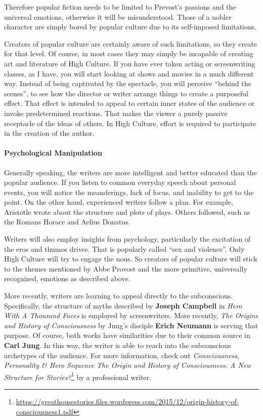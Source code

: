 Therefore popular fiction needs to be limited to Prevost's passions and the universal emotions, otherwise it will be misunderstood. Those of a nobler character are simply bored by popular culture due to its self-imposed limitations.

Creators of popular culture are certainly aware of such limitations, so they create for that level. Of course, in most cases they may simply be incapable of creating art and literature of High Culture. If you have ever taken acting or screenwriting classes, as I have, you will start looking at shows and movies in a much different way. Instead of being captivated by the spectacle, you will perceive ``behind the scenes'', to see how the director or writer arrange things to create a purposeful effect. That effect is intended to appeal to certain inner states of the audience or invoke predetermined reactions. That makes the viewer a purely passive receptacle of the ideas of others. In High Culture, effort is required to participate in the creation of the author.

\paragraph{Psychological Manipulation}


Generally speaking, the writers are more intelligent and better educated than the popular audience. If you listen to common everyday speech about personal events, you will notice the meanderings, lack of focus, and inability to get to the point. On the other hand, experienced writers follow a plan. For example, Aristotle wrote about the structure and plots of plays. Others followed, such as the Romans Horace and Aelius Donatus.

Writers will also employ insights from psychology, particularly the excitation of the eros and thumos drives. That is popularly called ``sex and violence''. Only High Culture will try to engage the nous. So creators of popular culture will stick to the themes mentioned by Abbe Provost and the more primitive, universally recognized, emotions as described above.

More recently, writers are learning to appeal directly to the subconscious. Specifically, the structure of myths described by \textbf{Joseph Campbell} in \emph{Hero With A Thousand Faces} is employed by screenwriters. More recently, \emph{The Origins and History of Consciousness} by Jung's disciple \textbf{Erich Neumann} is serving that purpose. Of course, both works have similarities due to their common source in \textbf{Carl Jung}. In this way, the writer is able to reach into the subconscious archetypes of the audience. For more information, check out \emph{Consciousness, Personality \& Hero Sequence The Origin and History of Consciousness: A New Structure for Stories?}\footnote{\url{https://greathousestories.files.wordpress.com/2015/12/origin-history-of-consciousness1.pdf}} by a professional writer.

